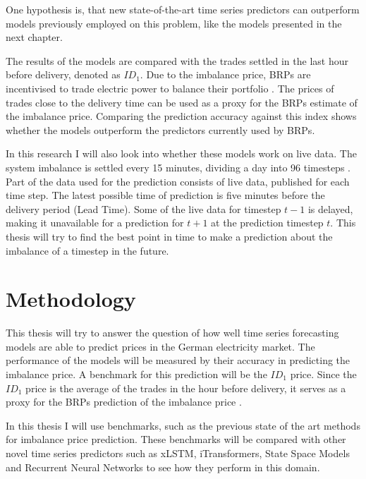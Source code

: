 \documentclass[class=scrbook, crop=false]{standalone}
\begin{document}
One hypothesis is, that new state-of-the-art time series predictors can outperform models previously employed on this problem, like the models presented in the next chapter. 

The results of the models are compared with the trades settled in the last hour before delivery, denoted as $ID_1$. Due to the imbalance price, BRPs are incentivised to trade electric power to balance their portfolio \cite{koch2020passive}. The prices of trades close to the delivery time can be used as a proxy for the BRPs estimate of the imbalance price. Comparing the prediction accuracy against this index shows whether the models outperform the predictors currently used by BRPs.

 In this research I will also look into whether these models work on live data. The system imbalance is settled every 15 minutes, dividing a day into 96 timesteps \cite{reBAP}. Part of the data used for the prediction consists of live data, published for each time step. 
The latest possible time of prediction is five minutes before the delivery period \cite{epex-brosch} (Lead Time). Some of the live data for timestep $t-1$ is delayed, making it unavailable for a prediction for $t+1$ at the prediction timestep $t$. This thesis will try to find the best point in time to make a prediction about the imbalance of a timestep in the future.



\section{Methodology}
\label{Section::Methodology}
This thesis will try to answer the question of how well time series forecasting models are able to predict prices in the German electricity market. The performance of the models will be measured by their accuracy in predicting the imbalance price. A benchmark for this prediction will be the $ID_1$ price. Since the $ID_1$ price is the average of the trades in the hour before delivery, it serves as a proxy for the BRPs prediction of the imbalance price \cite{narajewski2022probabilistic}. 

In this thesis I will use benchmarks, such as the previous state of the art methods for imbalance price prediction. These benchmarks will be compared with other novel time series predictors such as xLSTM, iTransformers, State Space Models and Recurrent Neural Networks to see how they perform in this domain.
\end{document}

